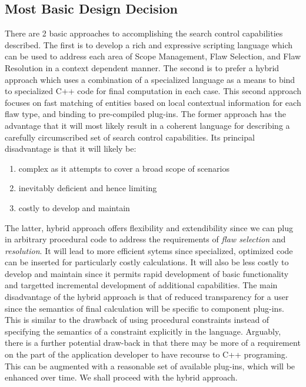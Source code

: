 \documentclass[10pt, letterpaper, oneside]{article}
\begin{document}
\subsection{Most Basic Design Decision}
There are 2 basic approaches to accomplishing the search control capabilities described. The first is to develop a rich and expressive scripting language which can be used to address each area of Scope Management, Flaw Selection, and Flaw Resolution in a context dependent manner. The second is to prefer a hybrid approach which uses a combination of a specialized language as a means to bind to specialized C++ code for final computation in each case. This second approach focuses on fast matching of entities based on local contextual information for each flaw type, and binding to pre-compiled plug-ins. The former approach has the advantage that it will most likely result in a coherent language for describing a carefully circumscribed set of search control capabilities. Its principal disadvantage is that it will likely be:
\begin{enumerate}
\item complex as it attempts to cover a broad scope of scenarios
\item inevitably deficient and hence limiting
\item costly to develop and maintain
\end{enumerate}

The latter, hybrid approach offers flexibility and extendibility since we can plug in arbitrary procedural code to address the requirements of {\em flaw selection} and {\em resolution}. It will lead to more efficient sytems since specialized, optimized code can be inserted for particularly costly calculations. It will also be less costly to develop and maintain since it permits rapid development of basic functionality and targetted incremental development of additional capabilities. The main disadvantage of the hybrid approach is that of reduced transparency for a user since the semantics of final calculation will be specific to component plug-ins. This is similar to the drawback of using procedural constraints instead of specifying the semantics of a constraint explicitly in the language. Arguably, there is a further potential draw-back in that there may be more of a requirement on the part of the application developer to have recourse to C++ programing. This can be augmented with a reasonable set of available plug-ins, which will be enhanced over time. We shall proceed with the hybrid approach.
\end{document}

